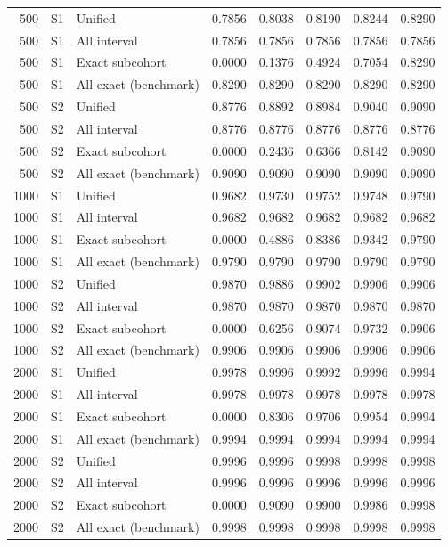\documentclass[12pt]{article}
\theoremstyle{definition}
\theoremstyle{remark}
\begin{document}
\begin{longtable}{rclrrrrr}
500 & S1 & Unified & 0.7856 & 0.8038 & 0.8190 & 0.8244 & 0.8290 \\
500 & S1 & All interval & 0.7856 & 0.7856 & 0.7856 & 0.7856 & 0.7856 \\
500 & S1 & Exact subcohort & 0.0000 & 0.1376 & 0.4924 & 0.7054 & 0.8290 \\
500 & S1 & All exact (benchmark) & 0.8290 & 0.8290 & 0.8290 & 0.8290 & 0.8290 \\
500 & S2 & Unified & 0.8776 & 0.8892 & 0.8984 & 0.9040 & 0.9090 \\
500 & S2 & All interval & 0.8776 & 0.8776 & 0.8776 & 0.8776 & 0.8776 \\
500 & S2 & Exact subcohort & 0.0000 & 0.2436 & 0.6366 & 0.8142 & 0.9090 \\
500 & S2 & All exact (benchmark) & 0.9090 & 0.9090 & 0.9090 & 0.9090 & 0.9090 \\
1000 & S1 & Unified & 0.9682 & 0.9730 & 0.9752 & 0.9748 & 0.9790 \\
1000 & S1 & All interval & 0.9682 & 0.9682 & 0.9682 & 0.9682 & 0.9682 \\
1000 & S1 & Exact subcohort & 0.0000 & 0.4886 & 0.8386 & 0.9342 & 0.9790 \\
1000 & S1 & All exact (benchmark) & 0.9790 & 0.9790 & 0.9790 & 0.9790 & 0.9790 \\
1000 & S2 & Unified & 0.9870 & 0.9886 & 0.9902 & 0.9906 & 0.9906 \\
1000 & S2 & All interval & 0.9870 & 0.9870 & 0.9870 & 0.9870 & 0.9870 \\
1000 & S2 & Exact subcohort & 0.0000 & 0.6256 & 0.9074 & 0.9732 & 0.9906 \\
1000 & S2 & All exact (benchmark) & 0.9906 & 0.9906 & 0.9906 & 0.9906 & 0.9906 \\
2000 & S1 & Unified & 0.9978 & 0.9996 & 0.9992 & 0.9996 & 0.9994 \\
2000 & S1 & All interval & 0.9978 & 0.9978 & 0.9978 & 0.9978 & 0.9978 \\
2000 & S1 & Exact subcohort & 0.0000 & 0.8306 & 0.9706 & 0.9954 & 0.9994 \\
2000 & S1 & All exact (benchmark) & 0.9994 & 0.9994 & 0.9994 & 0.9994 & 0.9994 \\
2000 & S2 & Unified & 0.9996 & 0.9996 & 0.9998 & 0.9998 & 0.9998 \\
2000 & S2 & All interval & 0.9996 & 0.9996 & 0.9996 & 0.9996 & 0.9996 \\
2000 & S2 & Exact subcohort & 0.0000 & 0.9090 & 0.9900 & 0.9986 & 0.9998 \\
2000 & S2 & All exact (benchmark) & 0.9998 & 0.9998 & 0.9998 & 0.9998 & 0.9998 \\
\end{longtable}
\endgroup
\end{document}
